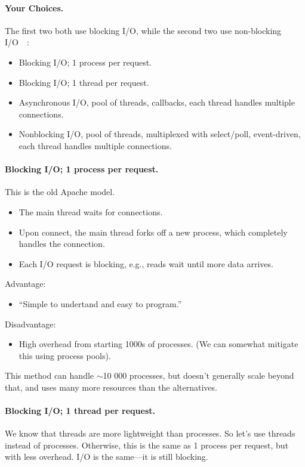 \documentclass[a4paper]{report}
\begin{document}
\paragraph{Your Choices.} The first two both use blocking I/O, while the second two use
non-blocking I/O~~\cite{gplus:concurrent}:
    \begin{itemize}
      \item Blocking I/O; 1 process per request.
      \item Blocking I/O; 1 thread per request.
      \item Asynchronous I/O, pool of threads, callbacks, each thread handles multiple connections.
      \item Nonblocking I/O, pool of threads, multiplexed with select/poll,
        event-driven, each thread handles multiple connections.
    \end{itemize}

\paragraph{Blocking I/O; 1 process per request.}
This is the old Apache model.
  \begin{itemize}
    \item The main thread waits for connections.
    \item Upon connect, the main thread forks off a new process, which completely
      handles the connection.
    \item Each I/O request is blocking, e.g., reads wait until more data arrives.
  \end{itemize}

Advantage: 
  \begin{itemize}
    \item ``Simple to undertand and easy to program.''
  \end{itemize}

Disadvantage:
  \begin{itemize}
    \item High overhead from starting 1000s of processes.
      (We can somewhat mitigate this using process pools).
  \end{itemize}
This method can handle $\sim$10 000 processes, but doesn't generally scale beyond that, and
uses many more resources than the alternatives.

\paragraph{Blocking I/O; 1 thread per request.}
    We know that threads are more lightweight than processes. So let's use threads instead
of processes. Otherwise, this is the same as 1 process per request, but with less overhead.
I/O is the same---it is still blocking.
\end{document}
